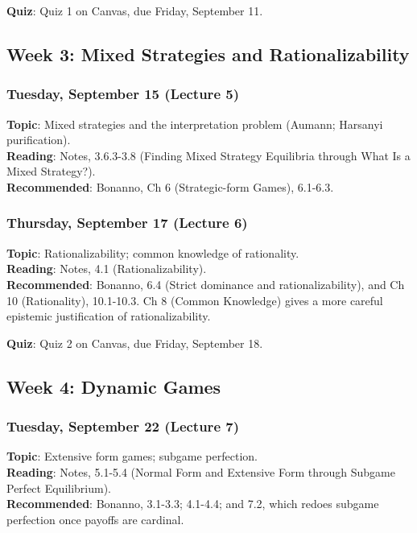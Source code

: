 \documentclass[
  letterpaper,
  DIV=11,
  numbers=noendperiod]{scrartcl}
\begin{document}
\textbf{Quiz}: Quiz 1 on Canvas, due Friday, September 11.

\subsection{Week 3: Mixed Strategies and
Rationalizability}\label{week-3-mixed-strategies-and-rationalizability}

\subsubsection{Tuesday, September 15 (Lecture
5)}\label{tuesday-september-15-lecture-5}

\textbf{Topic}: Mixed strategies and the interpretation problem (Aumann;
Harsanyi purification).\\
\textbf{Reading}: Notes, 3.6.3-3.8 (Finding Mixed Strategy Equilibria
through What Is a Mixed Strategy?).\\
\textbf{Recommended}: Bonanno, Ch 6 (Strategic-form Games), 6.1-6.3.

\subsubsection{Thursday, September 17 (Lecture
6)}\label{thursday-september-17-lecture-6}

\textbf{Topic}: Rationalizability; common knowledge of rationality.\\
\textbf{Reading}: Notes, 4.1 (Rationalizability).\\
\textbf{Recommended}: Bonanno, 6.4 (Strict dominance and
rationalizability), and Ch 10 (Rationality), 10.1-10.3. Ch 8 (Common
Knowledge) gives a more careful epistemic justification of
rationalizability.

\textbf{Quiz}: Quiz 2 on Canvas, due Friday, September 18.

\subsection{Week 4: Dynamic Games}\label{week-4-dynamic-games}

\subsubsection{Tuesday, September 22 (Lecture
7)}\label{tuesday-september-22-lecture-7}

\textbf{Topic}: Extensive form games; subgame perfection.\\
\textbf{Reading}: Notes, 5.1-5.4 (Normal Form and Extensive Form through
Subgame Perfect Equilibrium).\\
\textbf{Recommended}: Bonanno, 3.1-3.3; 4.1-4.4; and 7.2, which redoes
subgame perfection once payoffs are cardinal.
\end{document}
